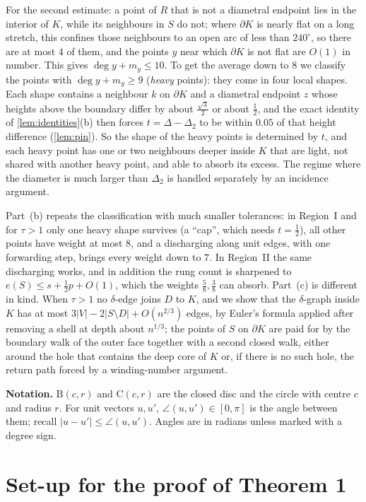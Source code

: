 \documentclass[11pt]{amsart}
\theoremstyle{definition}
\theoremstyle{remark}
\newcommand{\Dt}{\Delta_2}
\newcommand{\Cc}{\mathrm{C}}      %
\newcommand{\Dd}{\mathrm{B}}      %
\begin{document}
For the second estimate: a point of $R$ that is not a diametral endpoint lies in the interior of $K$, while its neighbours in $S$ do not; where $\partial K$ is nearly flat on a long stretch, this confines those neighbours to an open arc of less than $240^\circ$, so there are at most $4$ of them, and the points $y$ near which $\partial K$ is not flat are $O(1)$ in number. This gives $\deg y+m_y\le10$. To get the average down to $8$ we classify the points with $\deg y+m_y\ge9$ (\emph{heavy} points): they come in four local shapes. Each shape contains a neighbour $k$ on $\partial K$ and a diametral endpoint $z$ whose heights above the boundary differ by about $\frac{\sqrt3}2$ or about $\frac12$, and the exact identity of \cref{lem:identities}(b) then forces $t=\Delta-\Dt$ to be within $0.05$ of that height difference (\cref{lem:pin}). So the shape of the heavy points is determined by $t$, and each heavy point has one or two neighbours deeper inside $K$ that are light, not shared with another heavy point, and able to absorb its excess. The regime where the diameter is much larger than $\Dt$ is handled separately by an incidence argument.

Part~(b) repeats the classification with much smaller tolerances: in Region~I and for $\tau>1$ only one heavy shape survives (a ``cap'', which needs $t=\frac12$), all other points have weight at most $8$, and a discharging along unit edges, with one forwarding step, brings every weight down to $7$. In Region~II the same discharging works, and in addition the rung count is sharpened to $e(S)\le s+\frac12p+O(1)$, which the weights $\frac58,\frac38$ can absorb. Part~(c) is different in kind. When $\tau>1$ no $\delta$-edge joins $D$ to $K$, and we show that the $\delta$-graph inside $K$ has at most $3|V|-2|S\setminus D|+O(n^{2/3})$ edges, by Euler's formula applied after removing a shell at depth about $n^{1/3}$; the points of $S$ on $\partial K$ are paid for by the boundary walk of the outer face together with a second closed walk, either around the hole that contains the deep core of $K$ or, if there is no such hole, the return path forced by a winding-number argument.

\medskip\noindent\textbf{Notation.} $\Dd(c,r)$ and $\Cc(c,r)$ are the closed disc and the circle with centre $c$ and radius $r$. For unit vectors $u,u'$, $\angle(u,u')\in[0,\pi]$ is the angle between them; recall $|u-u'|\le\angle(u,u')$. Angles are in radians unless marked with a degree sign.

\section{Set-up for the proof of Theorem 1}\label{sec:setup}
\end{document}

